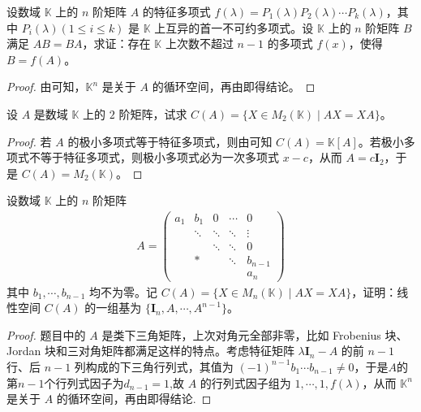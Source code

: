\documentclass[../../main.tex]{subfiles}
\begin{document}
\begin{example}
设数域 $\mathbb{K}$ 上的 $n$ 阶矩阵 $A$ 的特征多项式 $f(\lambda)=P_1(\lambda)P_2(\lambda)\cdots P_k(\lambda)$，其中 $P_i(\lambda) (1\leq i\leq k)$ 是 $\mathbb{K}$ 上互异的首一不可约多项式。设 $\mathbb{K}$ 上的 $n$ 阶矩阵 $B$ 满足 $AB = BA$，求证：存在 $\mathbb{K}$ 上次数不超过 $n - 1$ 的多项式 $f(x)$，使得 $B = f(A)$。
\end{example}
\begin{proof}
由可知，$\mathbb{K}^n$ 是关于 $A$ 的循环空间，再由即得结论。
\end{proof}

\begin{example}
设 $A$ 是数域 $\mathbb{K}$ 上的 $2$ 阶矩阵，试求 $C(A)=\{X\in M_2(\mathbb{K})\mid AX = XA\}$。
\end{example}
\begin{proof}
若 $A$ 的极小多项式等于特征多项式，则由可知 $C(A)=\mathbb{K}[A]$。若极小多项式不等于特征多项式，则极小多项式必为一次多项式 $x - c$，从而 $A = c\boldsymbol{I}_2$，于是 $C(A)=M_2(\mathbb{K})$。
\end{proof}

\begin{example}
设数域 $\mathbb{K}$ 上的 $n$ 阶矩阵
\begin{align*}
A=\begin{pmatrix}
a_1 & b_1 & 0 & \cdots & 0 \\
& \ddots & \ddots & \ddots & \vdots \\
& & \ddots & \ddots & 0 \\
& * & & \ddots & b_{n - 1} \\
& & & & a_n
\end{pmatrix}
\end{align*}
其中 $b_1,\cdots,b_{n - 1}$ 均不为零。记 $C(A)=\{X\in M_n(\mathbb{K})\mid AX = XA\}$，证明：线性空间 $C(A)$ 的一组基为 $\{\boldsymbol{I}_n,A,\cdots,A^{n - 1}\}$。
\end{example}
\begin{proof}
题目中的 $A$ 是类下三角矩阵，上次对角元全部非零，比如 Frobenius 块、Jordan 块和三对角矩阵都满足这样的特点。考虑特征矩阵 $\lambda\boldsymbol{I}_n - A$ 的前 $n - 1$ 行、后 $n - 1$ 列构成的下三角行列式，其值为 $(-1)^{n - 1}b_1\cdots b_{n - 1}\neq 0$，于是$A$的第$n-1$个行列式因子为$d_{n-1}=1$,故 $A$ 的行列式因子组为 $1,\cdots,1,f(\lambda)$，从而 $\mathbb{K}^n$ 是关于 $A$ 的循环空间，再由即得结论.
\end{proof}
\end{document}
